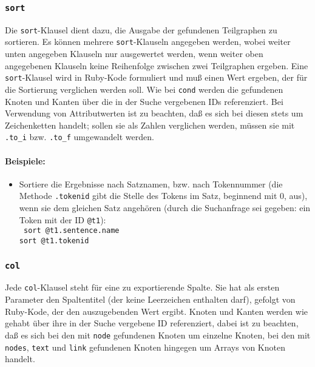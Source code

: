 \documentclass[12pt]{scrartcl}
\begin{document}
{\subsubsection{\texttt{sort}}

Die \texttt{sort}-Klausel dient dazu, die Ausgabe der gefundenen Teilgraphen zu sortieren. Es können mehrere \texttt{sort}-Klauseln angegeben werden, wobei weiter unten angegeben Klauseln nur ausgewertet werden, wenn  weiter oben angegebenen Klauseln keine Reihenfolge zwischen zwei Teilgraphen ergeben.
Eine \texttt{sort}-Klausel wird in Ruby-Kode formuliert und muß einen Wert ergeben, der für die Sortierung verglichen werden soll. Wie bei \texttt{cond} werden die gefundenen Knoten und Kanten über die in der Suche vergebenen IDs referenziert. Bei Verwendung von Attributwerten ist zu beachten, daß es sich bei diesen stets um Zeichenketten handelt; sollen sie als Zahlen verglichen werden, müssen sie mit \texttt{.to\_i} bzw. \texttt{.to\_f} umgewandelt werden.

\paragraph*{Beispiele:}
\begin{itemize}
	\item Sortiere die Ergebnisse nach Satznamen, bzw. nach Tokennummer (die Methode \texttt{.tokenid} gibt die Stelle des Tokens im Satz, beginnend mit 0, aus), wenn sie dem gleichen Satz angehören (durch die Suchanfrage sei gegeben: ein Token mit der ID \texttt{@t1}):\\
	{\tt
	sort @t1.sentence.name\\[-.4ex]
	sort @t1.tokenid\\[-.4ex]
	}
\end{itemize}



\subsubsection{\texttt{col}}

Jede \texttt{col}-Klausel steht für eine zu exportierende Spalte. Sie hat als ersten Parameter den Spaltentitel (der keine Leerzeichen enthalten darf), gefolgt von Ruby-Kode, der den auszugebenden Wert ergibt. Knoten und Kanten werden wie gehabt über ihre in der Suche vergebene ID referenziert, dabei ist zu beachten, daß es sich bei den mit \texttt{node} gefundenen Knoten um einzelne Knoten, bei den mit \texttt{nodes}, \texttt{text} und \texttt{link} gefundenen Knoten hingegen um Arrays von Knoten handelt.

}
\end{document}

